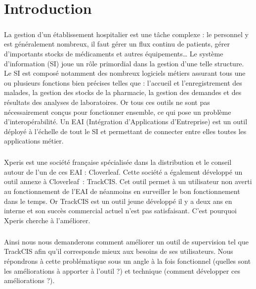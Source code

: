 \raggedbottom\chapter*{Introduction}
	\paragraph{}
	La gestion d'un établissement hospitalier est une tâche complexe :
	le personnel y est généralement nombreux, il faut gérer un flux continu de
	patients, gérer d'importants stocks de médicaments et autres équipements\ldots
	Le système d'information (SI) joue un rôle primordial dans la gestion d'une
	telle structure. Le SI est composé notamment des nombreux logiciels métiers
	assurant tous une ou plusieurs fonctions bien précises telles que : l'accueil
	et l'enregistrement des malades, la gestion des stocks de la pharmacie, la gestion
	des demandes et des résultats des analyses de laboratoires. Or tous ces
	outils ne sont pas nécessairement conçus pour fonctionner ensemble, ce qui
	pose un problème d'interopérabilité. Un EAI (Intégration d'Applications d'Entreprise)
	est un outil déployé à l'échelle de tout le SI et permettant de connecter
	entre elles toutes les applications métier.
	
	\paragraph{}
	Xperis est une société française spécialisée dans la distribution et le conseil
	autour de l'un de ces EAI : Cloverleaf. Cette société a également développé
	un outil annexe à Cloverleaf~: TrackCIS. Cet outil permet à un utilisateur non
	averti au fonctionnement de l'EAI de néanmoins en surveiller le bon
	fonctionnement dans le temps. Or TrackCIS est un outil jeune développé il y a
	deux ans en interne et son succès commercial actuel n'est pas satisfaisant.
	C'est pourquoi Xperis cherche à l'améliorer.
	
	\paragraph{}
	Ainsi nous nous demanderons comment améliorer un outil de supervision tel que
	TrackCIS afin qu'il corresponde mieux aux besoins de ses utilisateurs.\newline
	Nous répondrons à cette problématique sous un angle à la fois fonctionnel
	(quelles sont les améliorations à apporter à l'outil ?) et technique (comment
	développer ces améliorations ?).
	
